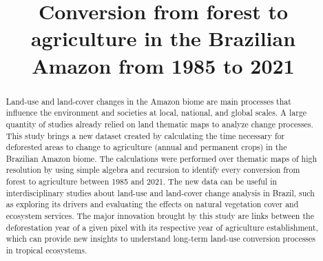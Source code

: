 \documentclass[essd, manuscript]{copernicus}
\begin{document}
\title{Conversion from forest to agriculture in the Brazilian Amazon from 1985 to 2021}











\received{}
\pubdiscuss{} %
\revised{}
\accepted{}
\published{}




\maketitle


\begin{abstract}
Land-use and land-cover changes in the Amazon biome are main processes that influence the environment and societies at local, national, and global scales. A large quantity of studies already relied on land thematic maps to analyze change processes. This study brings a new dataset created by calculating the time necessary for deforested areas to change to agriculture (annual and permanent crops) in the Brazilian Amazon biome. The calculations were performed over thematic maps of high resolution by using simple algebra and recursion to identify every conversion from forest to agriculture between 1985 and 2021. The new data can be useful in interdisciplinary studies about land-use and land-cover change analysis in Brazil, such as exploring its drivers and evaluating the effects on natural vegetation cover and ecosystem services. The major innovation brought by this study are links between the deforestation year of a given pixel with its respective year of agriculture establishment, which can provide new insights to understand long-term land-use conversion processes in tropical ecosystems.
\end{abstract}
\end{document}
